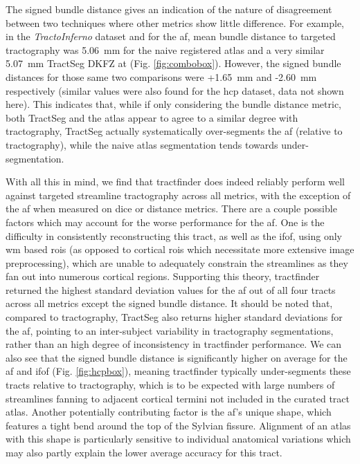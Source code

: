 The signed bundle distance gives an indication of the nature of disagreement between two techniques where other metrics show little difference.
For example, in the \textit{TractoInferno} dataset and for the \gls{af}, mean bundle distance to targeted tractography was 5.06~mm for the naive registered atlas and a very similar 5.07~mm TractSeg DKFZ at (Fig. \ref{fig:combobox}). %
However, the signed bundle distances for those same two comparisons were +1.65~mm and -2.60~mm respectively (similar values were also found for the \gls{hcp} dataset, data not shown here).
This indicates that, while if only considering the bundle distance metric, both TractSeg and the atlas appear to agree to a similar degree with tractography, TractSeg actually systematically over-segments the \gls{af} (relative to tractography), while the naive atlas segmentation tends towards under-segmentation.

With all this in mind, we find that tractfinder does indeed reliably perform well against targeted streamline tractography across all metrics, with the exception of the \gls{af} when measured on \gls{dice} or distance metrics.
There are a couple possible factors which may account for the worse performance for the \gls{af}.
One is the difficulty in consistently reconstructing this tract, as well as the \gls{ifof}, using only \gls{wm} based \glspl{roi} (as opposed to cortical \glspl{roi} which necessitate more extensive image preprocessing), which are unable to adequately constrain the streamlines as they fan out into numerous cortical regions.
Supporting this theory, tractfinder returned the highest standard deviation values for the \gls{af} out of all four tracts across all metrics except the signed bundle distance.
It should be noted that, compared to tractography, TractSeg also returns higher standard deviations for the \gls{af}, pointing to an inter-subject variability in tractography segmentations, rather than an high degree of inconsistency in tractfinder performance.
We can also see that the signed bundle distance is significantly higher on average for the \gls{af} and \gls{ifof} (Fig. \ref{fig:hcpbox}), meaning tractfinder typically under-segments these tracts relative to tractography, which is to be expected with large numbers of streamlines fanning to adjacent cortical termini not included in the curated tract atlas.
Another potentially contributing factor is the \gls{af}'s unique shape, which features a tight bend around the top of the Sylvian fissure.
Alignment of an atlas with this shape is particularly sensitive to individual anatomical variations which may also partly explain the lower average accuracy for this tract.

